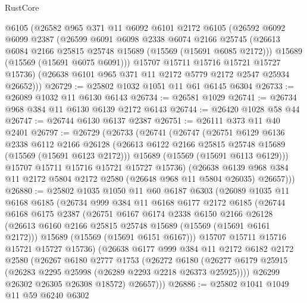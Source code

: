 \begin{lexlean}{RustCore}
\begin{coremodule}
      @6105
      (@26582
        @965
        @371
        @11
        @6092
        @6101
        @2172
        @6105
        (@26592
          @6092
          @6099
          @2387
          (@26599
            @6091
            @6098
            @2338
            @6074
            @2166
            @25745
            (@26613 @6084 @2166 @25815 @25748 @15689 (@15569 (@15691 @6085 @2172)))
            @15689
            (@15569 (@15691 @6075 @6091)))
          @15707
          @15711
          @15716
          @15721
          @15727
          @15736)
        (@26638 @6101 @965 @371 @11 @2172 @5779 @2172 @2547 @25934 @26652)))
@26729 := @25802 @1032 @1051 @11 @61 @6145 @6304
@26733 := @26089 @1032 @11 @6130 @6143
@26734 := @26581 @1029
@26741 := @26734 @968 @384 @11 @6130 @6139 @2172 @6143
@26744 := @26420 @1028 @58 @44
@26747 := @26744 @6130 @6137 @2387
@26751 := @26111 @373 @11 @40 @2401
@26797 := @26729
    (@26733
      (@26741
        (@26747
          (@26751
            @6129
            @6136
            @2338
            @6112
            @2166
            @26128
            (@26613 @6122 @2166 @25815 @25748 @15689 (@15569 (@15691 @6123 @2172)))
            @15689
            (@15569 (@15691 @6113 @6129)))
          @15707
          @15711
          @15716
          @15721
          @15727
          @15736)
        (@26638 @6139 @968 @384 @11 @2172 @5804 @2172 @2580 (@26648 @968 @11 @5804 @26035) @26657)))
@26880 := @25802
    @1035
    @1050
    @11
    @60
    @6187
    @6303
    (@26089
      @1035
      @11
      @6168
      @6185
      (@26734
        @999
        @384
        @11
        @6168
        @6177
        @2172
        @6185
        (@26744
          @6168
          @6175
          @2387
          (@26751
            @6167
            @6174
            @2338
            @6150
            @2166
            @26128
            (@26613 @6160 @2166 @25815 @25748 @15689 (@15569 (@15691 @6161 @2172)))
            @15689
            (@15569 (@15691 @6151 @6167)))
          @15707
          @15711
          @15716
          @15721
          @15727
          @15736)
        (@26638
          @6177
          @999
          @384
          @11
          @2172
          @6182
          @2172
          @2580
          (@26267
            @6180
            @2777
            @1753
            (@26272
              @6180
              (@26277 @6179 @25915 (@26283 @2295 @25998 (@26289 @2293 @2218 @26373 @25925))))
            @26299
            @26302
            @26305
            @26308
            @18572)
          @26657)))
@26886 := @25802 @1041 @1049 @11 @59 @6240 @6302

\end{coremodule}
\end{lexlean}
